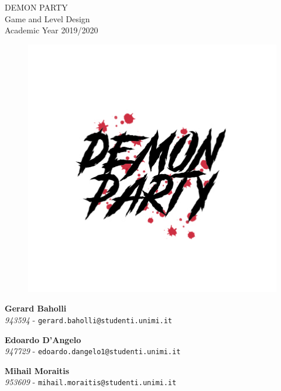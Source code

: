 {	\vspace*{7mm}

	\begin{center}
		\LARGE DEMON PARTY\\
		\vspace*{2mm}
		\Large Game and Level Design\\
		\large Academic Year 2019/2020
	\end{center}

	\newpage

	\begin{figure}
		\centering
		\includegraphics[width=0.8\linewidth]{images/frontespizio/demonparty_logo.jpg}
	\end{figure}

	\vspace*{2mm}

	\begin{center}
		\textbf{Gerard Baholli}\\
		\textit{943594} - \texttt{gerard.baholli@studenti.unimi.it}\\
	
		\vspace*{7mm}
	
		\textbf{Edoardo D'Angelo}\\
		\textit{947729} - \texttt{edoardo.dangelo1@studenti.unimi.it}\\
	
		\vspace*{7mm}
	
		\textbf{Mihail Moraitis}\\
		\textit{953609} - \texttt{mihail.moraitis@studenti.unimi.it}\\
	\end{center}
}